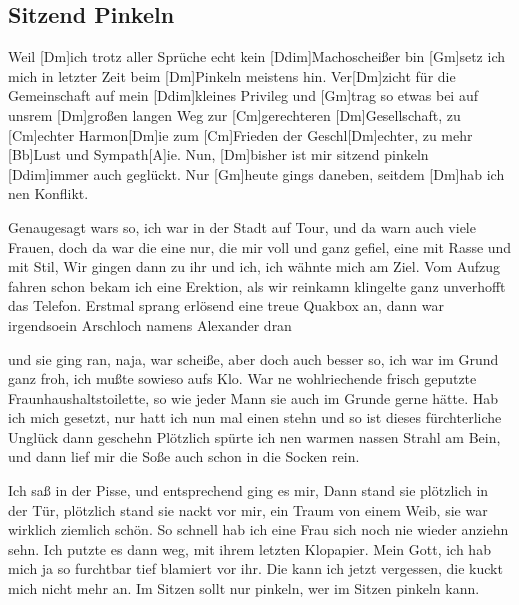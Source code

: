 \subsection*{Sitzend Pinkeln   }
\begin{guitar}

    Weil [Dm]ich trotz aller Sprüche echt kein [Ddim]Machoscheißer bin 
    [Gm]setz ich mich in letzter Zeit beim [Dm]Pinkeln meistens hin. 
    Ver[Dm]zicht für die Gemeinschaft auf mein [Ddim]kleines Privileg 
    und [Gm]trag so etwas bei auf unsrem [Dm]großen langen Weg 
    zur [Cm]gerechteren [Dm]Gesellschaft, zu [Cm]echter Harmon[Dm]ie 
    zum [Cm]Frieden der Geschl[Dm]echter, zu mehr [Bb]Lust und Sympath[A]ie. 
    Nun, [Dm]bisher ist mir sitzend pinkeln [Ddim]immer auch geglückt. 
    Nur [Gm]heute gings daneben, seitdem [Dm]hab ich nen Konflikt. 


    Genaugesagt wars so, ich war in der Stadt auf Tour, 
    und da warn auch viele Frauen, doch da war die eine nur, 
    die mir voll und ganz gefiel, eine mit Rasse und mit Stil, 
    Wir gingen dann zu ihr und ich, ich wähnte mich am Ziel. 
    Vom Aufzug fahren schon bekam ich eine Erektion, 
    als wir reinkamn klingelte ganz unverhofft das Telefon. 
    Erstmal sprang erlösend eine treue Quakbox an, 
    dann war irgendsoein Arschloch namens Alexander dran 


    und sie ging ran, naja, war scheiße, aber doch auch besser so, 
    ich war im Grund ganz froh, ich mußte sowieso aufs Klo. 
    War ne wohlriechende frisch geputzte Fraunhaushaltstoilette, 
    so wie jeder Mann sie auch im Grunde gerne hätte. 
    Hab ich mich gesetzt, nur hatt ich nun mal einen stehn 
    und so ist dieses fürchterliche Unglück dann geschehn 
    Plötzlich spürte ich nen warmen nassen Strahl am Bein, 
    und dann lief mir die Soße auch schon in die Socken rein. 


    Ich saß in der Pisse, und entsprechend ging es mir, 
    Dann stand sie plötzlich in der Tür, plötzlich stand sie nackt vor mir, 
    ein Traum von einem Weib, sie war wirklich ziemlich schön. 
    So schnell hab ich eine Frau sich noch nie wieder anziehn sehn. 
    Ich putzte es dann weg, mit ihrem letzten Klopapier. 
    Mein Gott, ich hab mich ja so furchtbar tief blamiert vor ihr. 
     Die kann ich jetzt vergessen, die kuckt mich nicht mehr an. 
    Im Sitzen sollt nur pinkeln, wer im Sitzen pinkeln kann. 

\end{guitar}
